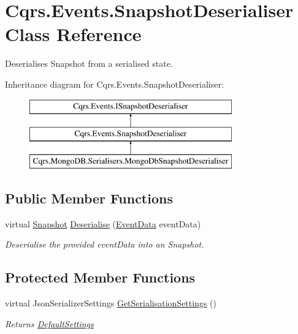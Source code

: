 \hypertarget{classCqrs_1_1Events_1_1SnapshotDeserialiser}{}\section{Cqrs.\+Events.\+Snapshot\+Deserialiser Class Reference}
\label{classCqrs_1_1Events_1_1SnapshotDeserialiser}


Deserialises Snapshot from a serialised state.  


Inheritance diagram for Cqrs.\+Events.\+Snapshot\+Deserialiser\+:\begin{figure}[H]
\begin{center}
\leavevmode
\includegraphics[height=3.000000cm]{classCqrs_1_1Events_1_1SnapshotDeserialiser}
\end{center}
\end{figure}
\subsection*{Public Member Functions}
\begin{DoxyCompactItemize}
\item 
virtual \hyperlink{classCqrs_1_1Snapshots_1_1Snapshot}{Snapshot} \hyperlink{classCqrs_1_1Events_1_1SnapshotDeserialiser_a0c2b0f71dd0aad4d4b65d847a6e50902_a0c2b0f71dd0aad4d4b65d847a6e50902}{Deserialise} (\hyperlink{classCqrs_1_1Events_1_1EventData}{Event\+Data} event\+Data)
\begin{DoxyCompactList}\small\item\em Deserialise the provided {\itshape event\+Data}  into an Snapshot. \end{DoxyCompactList}\end{DoxyCompactItemize}
\subsection*{Protected Member Functions}
\begin{DoxyCompactItemize}
\item 
virtual Json\+Serializer\+Settings \hyperlink{classCqrs_1_1Events_1_1SnapshotDeserialiser_a3596360abc7bddc12a2a6bb9c6137dec_a3596360abc7bddc12a2a6bb9c6137dec}{Get\+Serialisation\+Settings} ()
\begin{DoxyCompactList}\small\item\em Returns \hyperlink{classCqrs_1_1Events_1_1SnapshotDeserialiser_a0fb10c8d8409303ba635b1b596449844_a0fb10c8d8409303ba635b1b596449844}{Default\+Settings} \end{DoxyCompactList}\end{DoxyCompactItemize}
